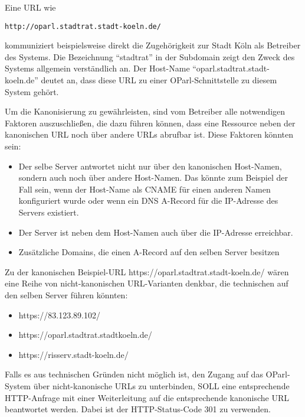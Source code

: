 \documentclass[,a4paper]{article}
\begin{document}
Eine URL wie

\begin{verbatim}
http://oparl.stadtrat.stadt-koeln.de/
\end{verbatim}

kommuniziert beispielsweise direkt die Zugehörigkeit zur Stadt Köln als
Betreiber des Systems. Die Bezeichnung ``stadtrat'' in der Subdomain
zeigt den Zweck des Systems allgemein verständlich an. Der Host-Name
``oparl.stadtrat.stadt-koeln.de'' deutet an, dass diese URL zu einer
OParl-Schnittstelle zu diesem System gehört.

Um die Kanonisierung zu gewährleisten, sind vom Betreiber alle
notwendigen Faktoren auszuschließen, die dazu führen können, dass eine
Ressource neben der kanonischen URL noch über andere URLs abrufbar ist.
Diese Faktoren könnten sein:

\begin{itemize}
\item
  Der selbe Server antwortet nicht nur über den kanonischen Host-Namen,
  sondern auch noch über andere Host-Namen. Das könnte zum Beispiel der
  Fall sein, wenn der Host-Name als CNAME für einen anderen Namen
  konfiguriert wurde oder wenn ein DNS A-Record für die IP-Adresse des
  Servers existiert.
\item
  Der Server ist neben dem Host-Namen auch über die IP-Adresse
  erreichbar.
\item
  Zusätzliche Domains, die einen A-Record auf den selben Server besitzen
\end{itemize}

Zu der kanonischen Beispiel-URL https://oparl.stadtrat.stadt-koeln.de/
wären eine Reihe von nicht-kanonischen URL-Varianten denkbar, die
technischen auf den selben Server führen könnten:

\begin{itemize}
\itemsep1pt\parskip0pt
\item
  https://83.123.89.102/
\item
  https://oparl.stadtrat.stadtkoeln.de/
\item
  https://risserv.stadt-koeln.de/
\end{itemize}

Falls es aus technischen Gründen nicht möglich ist, den Zugang auf das
OParl-System über nicht-kanonische URLs zu unterbinden, SOLL eine
entsprechende HTTP-Anfrage mit einer Weiterleitung auf die entsprechende
kanonische URL beantwortet werden. Dabei ist der HTTP-Status-Code 301 zu
verwenden.
\end{document}
